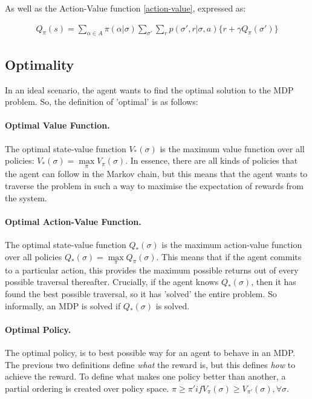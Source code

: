 \documentclass[ %
                    author={Ashwinder Khurana},
                supervisor={Prof Dave Cliff},
                    degree={MEng},
                     title={The Deeply Reinforced Trader},
                  subtitle={},
                      type={enterprise},
                      year={2020} ]{dissertation}
\begin{document}
{\noindent
As well as the Action-Value function \ref{action-value}, expressed as:

\begin{equation}
\label{action-value-bellman}
\begin{split}
Q_\pi(s) = \sum\limits^{}_{\alpha \in A}{\pi(\alpha | \sigma)} \sum\limits^{}_{\sigma'}{\sum\limits^{}_{r}{p(\sigma' , r | \sigma, a) \{r + \gamma Q_\pi(\sigma')\}}}
\end{split}
\end{equation}
\vspace{0.5cm}

\subsection{Optimality}
\label{Optimality}

In an ideal scenario, the agent wants to find the optimal solution to the MDP problem. So, the definition of 'optimal' is as follows:

\paragraph{Optimal Value Function.} The optimal state-value function $V_*(\sigma)$ is the maximum value function over all policies: $V_*(\sigma) = \max\limits_\pi V_\pi(\sigma)$. In essence, there are all kinds of policies that the agent can follow in the Markov chain, but this means that the agent wants to traverse the problem in such a way to maximise the expectation of rewards from the system. 
 
\paragraph{Optimal Action-Value Function.} The optimal state-value function $Q_*(\sigma)$ is the maximum action-value function over all policies $Q_*(\sigma) = \max\limits_\pi Q_\pi(\sigma)$. This means that if the agent commits to a particular action, this provides the maximum possible returns out of every possible traversal thereafter. Crucially, if the agent knows $Q_*(\sigma)$, then it has found the best possible traversal, so it has 'solved' the entire problem. So informally, an MDP is solved if  $Q_*(\sigma)$ is solved.

\paragraph{Optimal Policy.} The optimal policy, is to best possible way for an agent to behave in an MDP. The previous two definitions define \textit{what} the reward is, but this defines \textit{how} to achieve the reward. To define what makes one policy better than another, a partial ordering is created over policy space. $\pi \geq \pi'  if  V_\pi(\sigma) \geq V_{\pi'}(\sigma), \forall \sigma$. 

}
\end{document}
